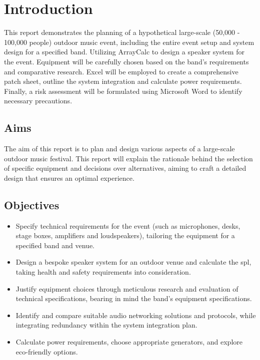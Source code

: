 \section{Introduction}
    This report demonstrates the planning of a hypothetical large-scale (50,000 - 100,000 people) outdoor music event, including the entire event setup and system design for a specified band. Utilizing ArrayCalc to design a speaker system for the event. Equipment will be carefully chosen based on the band's requirements and comparative research. Excel will be employed to create a comprehensive patch sheet, outline the system integration and calculate power requirements. Finally, a risk assessment will be formulated using Microsoft Word to identify necessary precautions.

    \subsection{Aims}
    The aim of this report is to plan and design various aspects of a large-scale outdoor music festival. This report will explain the rationale behind the selection of specific equipment and decisions over alternatives, aiming to craft a detailed design that ensures an optimal experience.
    
    \subsection{Objectives}
        \begin{itemize}
            \item Specify technical requirements for the event (such as microphones, desks, stage boxes, amplifiers and loudspeakers), tailoring the equipment for a specified band and venue.
            \item Design a bespoke speaker system for an outdoor venue and calculate the \acrfull{spl}, taking health and safety requirements into consideration.
            \item Justify equipment choices through meticulous research and evaluation of technical specifications, bearing in mind the band's equipment specifications.
            \item Identify and compare suitable audio networking solutions and protocols, while integrating redundancy within the system integration plan.
            \item Calculate power requirements, choose appropriate generators, and explore eco-friendly options.
        \end{itemize}